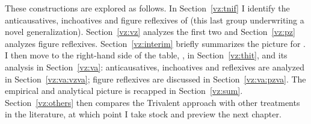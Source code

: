 These constructions are explored as follows. In Section~\ref{vz:tnif} I identify the anticausatives, inchoatives and figure reflexives of {\tnif} (this last group underwriting a novel generalization). Section~\ref{vz:vz} analyzes the first two and Section~\ref{vz:pz} analyzes figure reflexives. Section~\ref{vz:interim} briefly summarizes the picture for {\tnif}. I then move to the right-hand side of the table, {\thit}, in Section~\ref{vz:thit}, and its analysis in Section~\ref{vz:va}: anticausatives, inchoatives and reflexives are analyzed in Section~\ref{vz:va:vzva}; figure reflexives are discussed in Section~\ref{vz:va:pzva}. The empirical and analytical picture is recapped in Section~\ref{vz:sum}. Section~\ref{vz:others} then compares the Trivalent approach with other treatments in the literature, at which point I take stock and preview the next chapter.



